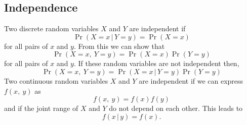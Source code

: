 \documentclass{article}
\begin{document}
\subsection{Independence}
Two discrete random variables \(X\) and \(Y\) are independent if
\begin{equation*}
    \Pr{\left( X = x \,\vert\, Y = y \right)} = \Pr{\left( X = x \right)}
\end{equation*}
for all pairs of \(x\) and \(y\). From this we can show that
\begin{equation*}
    \Pr{\left( X = x ,\: Y = y \right)} = \Pr{\left( X = x \right)} \Pr{\left( Y = y \right)}
\end{equation*}
for all pairs of \(x\) and \(y\). If these random variables are not independent then,
\begin{equation*}
    \Pr{\left( X = x ,\: Y = y \right)} = \Pr{\left( X = x \,\vert\, Y = y \right)} \Pr{\left( Y = y \right)}
\end{equation*}
Two continuous random variables \(X\) and \(Y\) are independent if we can express \(f\left( x,\: y \right)\) as
\begin{equation*}
    f\left( x,\: y \right) = f\left( x \right) f\left( y \right)
\end{equation*}
and if the joint range of \(X\) and \(Y\) do not depend on each other. This leads to
\begin{equation*}
    f\left( x \,\vert\, y \right) = f\left( x \right).
\end{equation*}
\end{document}
